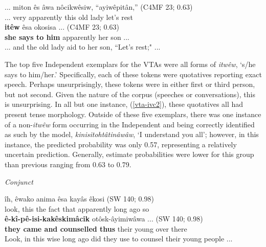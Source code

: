     \begin{exe}
    \ex 
    \gll ... miton ês âwa nôcikwêsiw, ``ayiwêpitân,'' \tiny{(C4MF 23; 0.63)} \\
         ... very apparently {this old lady} {let's rest} \\
    \gll \textbf{itêw} êsa okosisa ... \tiny{(C4MF 23; 0.63)} \\
          {\textbf{she says to him}} apparently {her son} ... \\
    \trans ... and the old lady aid to her son, ``Let's rest;" ... \tiny{\citep[106-107]{Bearetal1992}} \\
    \label{vta-ivc5}
    \end{exe}
    
The top five Independent exemplars for the VTAs were all forms of \textit{itwêw}, `s/he says to him/her.' Specifically, each of these tokens were quotatives reporting exact speech. Perhaps unsurprisingly, these tokens were in either first or third person, but not second. Given the nature of the corpus (speeches or conversations), this is unsurprising. In all but one instance, (\ref{vta-ivc2}), these quotatives all had present tense morphology. Outside of these five exemplars, there was one instance of a non-\textit{itwêw} form occurring in the Independent and being correctly identified as such by the model, \textit{kinisitohtâtinâwâw}, `I understand you all'; however, in this instance, the predicted probability was only 0.57, representing a relatively uncertain prediction. Generally, estimate probabilities were lower for this group than previous ranging from 0.63 to 0.79. 

\vspace{5mm}

\textit{Conjunct}

    \begin{exe}
    \ex 
    \gll îh, êwako anima êsa kayâs êkosi \tiny{(SW 140; 0.98)} \\
    look, this {the fact that} apparently {long ago} so  \\
    \gll \textbf{ê-kî-pê-isi-kakêskimâcik} otôsk-âyimiwâwa ... \tiny{(SW 140; 0.98)} \\
         {\textbf{they came and counselled thus}} {their young over there} \\
    \trans Look, in this wise long ago did they use to counsel their young people ... \tiny{\citep[76-77]{Whitecalf1993}} \\
    \label{vta-ivc6}
    \end{exe}
    


